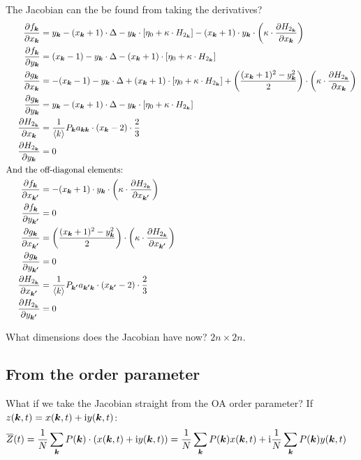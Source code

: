 The Jacobian can the be found from taking the derivatives?
\begin{align*}
\frac{\partial f_{{\boldsymbol{k}}}}{\partial x_{{\boldsymbol{k}}}} &= y_{{\boldsymbol{k}}}-(x_{{\boldsymbol{k}}}+1) \cdot \Delta-y_{{\boldsymbol{k}}} \cdot \left[\eta_{0} + \kappa \cdot H_{2_{{\boldsymbol{k}}}} \right] - (x_{{\boldsymbol{k}}}+1) \cdot y_{{\boldsymbol{k}}} \cdot \left(\kappa \cdot \frac{\partial H_{2_{{\boldsymbol{k}}}}}{\partial x_{{\boldsymbol{k}}}}\right)\\
\frac{\partial f_{{\boldsymbol{k}}}}{\partial y_{{\boldsymbol{k}}}} &= (x_{{\boldsymbol{k}}}-1)-y_{{\boldsymbol{k}}} \cdot \Delta-(x_{{\boldsymbol{k}}}+1) \cdot \left[\eta_{0} + \kappa \cdot H_{2_{{\boldsymbol{k}}}} \right] \\
\frac{\partial g_{{\boldsymbol{k}}}}{\partial x_{{\boldsymbol{k}}}} &= -(x_{{\boldsymbol{k}}} - 1) - y_{{\boldsymbol{k}}} \cdot \Delta + (x_{{\boldsymbol{k}}} + 1) \cdot \left[\eta_{0} + \kappa \cdot H_{2_{{\boldsymbol{k}}}} \right] + \left( \frac{(x_{{\boldsymbol{k}}} + 1)^2 - y_{{\boldsymbol{k}}}^2}{2} \right) \cdot \left(\kappa \cdot \frac{\partial H_{2_{{\boldsymbol{k}}}}}{\partial x_{{\boldsymbol{k}}}}\right) \\
\frac{\partial g_{{\boldsymbol{k}}}}{\partial y_{{\boldsymbol{k}}}} &= y_{{\boldsymbol{k}}} - (x_{{\boldsymbol{k}}} + 1)\cdot \Delta - y_{{\boldsymbol{k}}} \cdot \left[\eta_{0} + \kappa \cdot H_{2_{{\boldsymbol{k}}}} \right] \\
\frac{\partial H_{2_{{\boldsymbol{k}}}}}{\partial x_{{\boldsymbol{k}}}} &= \frac{1}{\langle k\rangle} P_{{\boldsymbol{k}}} a_{{\boldsymbol{k}} {\boldsymbol{k}}} \cdot(x_{{\boldsymbol{k}}}-2) \cdot \frac{2}{3} \\
\frac{\partial H_{2_{{\boldsymbol{k}}}}}{\partial y_{{\boldsymbol{k}}}} &= 0 \\
\text{And the } & \text{off-diagonal elements:} \\
\frac{\partial f_{{\boldsymbol{k}}}}{\partial x_{{\boldsymbol{k'}}}} &= - (x_{{\boldsymbol{k}}}+1) \cdot y_{{\boldsymbol{k}}} \cdot \left(\kappa \cdot \frac{\partial H_{2_{{\boldsymbol{k}}}}}{\partial x_{{\boldsymbol{k'}}}}\right)\\
\frac{\partial f_{{\boldsymbol{k}}}}{\partial y_{{\boldsymbol{k'}}}} &= 0 \\
\frac{\partial g_{{\boldsymbol{k}}}}{\partial x_{{\boldsymbol{k'}}}} &= \left( \frac{(x_{{\boldsymbol{k}}} + 1)^2 - y_{{\boldsymbol{k}}}^2}{2} \right) \cdot \left(\kappa \cdot \frac{\partial H_{2_{{\boldsymbol{k}}}}}{\partial x_{{\boldsymbol{k'}}}}\right) \\
\frac{\partial g_{{\boldsymbol{k}}}}{\partial y_{{\boldsymbol{k'}}}} &= 0\\
\frac{\partial H_{2_{{\boldsymbol{k}}}}}{\partial x_{{\boldsymbol{k'}}}} &= \frac{1}{\langle k\rangle} P_{{\boldsymbol{k'}}} a_{{\boldsymbol{k'}} {\boldsymbol{k}}} \cdot(x_{{\boldsymbol{k'}}}-2) \cdot \frac{2}{3} \\
\frac{\partial H_{2_{{\boldsymbol{k}}}}}{\partial y_{{\boldsymbol{k'}}}} &= 0
\end{align*}

What dimensions does the Jacobian have now? $2 n \times 2 n$.

 


\subsection{From the order parameter}
What if we take the Jacobian straight from the OA order parameter? If $z({\boldsymbol{k}},t) = x({\boldsymbol{k}},t) + {\rm{i}} y({\boldsymbol{k}},t)$:
\begin{align}
\overline{Z}(t) &= \frac{1}{N} \sum_{{\boldsymbol{k}}} P({\boldsymbol{k}}) \cdot \left( x({\boldsymbol{k}},t) + {\rm{i}} y({\boldsymbol{k}},t) \right) = \frac{1}{N} \sum_{{\boldsymbol{k}}} P({\boldsymbol{k}}) x({\boldsymbol{k}},t) + {\rm{i}} \frac{1}{N} \sum_{{\boldsymbol{k}}} P({\boldsymbol{k}}) y({\boldsymbol{k}},t)  
\end{align}




\small{}

\label{LastPage}~


